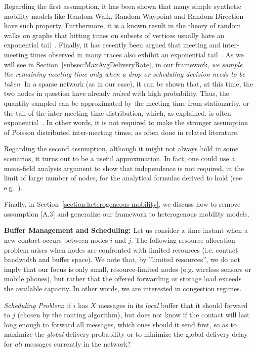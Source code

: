 Regarding the first assumption, it has been shown that many simple synthetic mobility models like Random Walk, Random Waypoint and Random Direction~\cite{akis:mobihoc06,Inria:MessageDelay} have such property. Furthermore, it is a known result in the theory of random walks on graphs that hitting times on subsets of vertices usually have an exponential tail~\cite{Aldous:book}. Finally, it has recently been argued that meeting and inter-meeting times observed in many traces also exhibit an exponential tail~\cite{LeBoudec:Mobicom07}. As we will see in Section~\ref{subsec:MaxAvgDeliveryRate}, in our framework, \emph{we sample the remaining meeting time only when a drop or scheduling decision needs to be taken}. In a sparse network (as in our case), it can be shown that, at this time, the two nodes in question have already \emph{mixed} with high probability. Thus, the quantity sampled can be approximated by the meeting time from stationarity, or the tail of the inter-meeting time distribution, which, as explained, is often exponential~\cite{Akis:IJAACS2008}. In other words, it is not required to make the stronger assumption of Poisson distributed inter-meeting times, as often done in related literature.

Regarding the second assumption, although it might not always hold in some scenarios, it turns out to be a useful approximation. In fact, one could use a mean-field analysis argument to show that independence is not required, in the limit of large number of nodes, for the analytical formulas derived to hold (see e.g.~\cite{LeBoudec:Sigmetrics09}).

Finally, in Section~\ref{section:heterogeneous-mobility}, we discuss how to remove assumption [A.3] and generalize our framework to heterogenous mobility models.


\textbf{Buffer Management and Scheduling:} Let us consider a time instant when a new contact occurs between nodes $i$ and $j$. The following resource allocation problem arises when nodes are confronted with limited resources (i.e. contact bandwidth and buffer space). We note that, by ''limited resources'', we do not imply that our focus is only small, resource-limited nodes (e.g. wireless sensors or mobile phones), but rather that the offered forwarding or storage load exceeds the available capacity. In other words, we are interested in congestion regimes.

\emph{Scheduling Problem}: if $i$ has $X$ messages in its \emph{local} buffer that it should forward to $j$ (chosen by the routing algorithm), but does not know if the contact will last long enough to forward all messages, which ones should it send first, so as to maximize the \emph{global} delivery probability or to minimize the global delivery delay for \emph{all} messages currently in the network?

